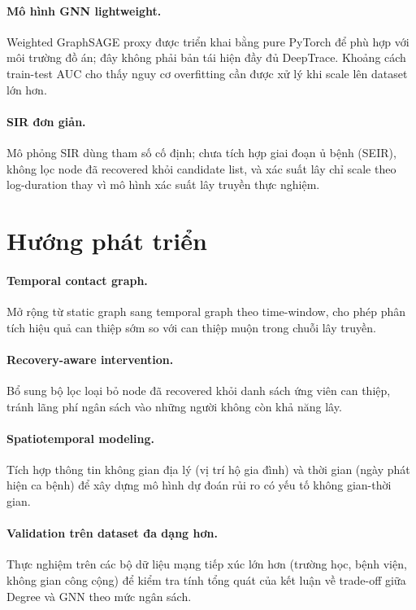 \documentclass[12pt,a4paper]{report}
\theoremstyle{definition}
\begin{document}
\paragraph{Mô hình GNN lightweight.} Weighted GraphSAGE proxy được triển khai bằng pure PyTorch để phù hợp với môi trường đồ án; đây không phải bản tái hiện đầy đủ DeepTrace. Khoảng cách train-test AUC cho thấy nguy cơ overfitting cần được xử lý khi scale lên dataset lớn hơn.

\paragraph{SIR đơn giản.} Mô phỏng SIR dùng tham số cố định; chưa tích hợp giai đoạn ủ bệnh (SEIR), không lọc node đã recovered khỏi candidate list, và xác suất lây chỉ scale theo log-duration thay vì mô hình xác suất lây truyền thực nghiệm.

\section{Hướng phát triển}

\paragraph{Temporal contact graph.} Mở rộng từ static graph sang temporal graph theo time-window, cho phép phân tích hiệu quả can thiệp sớm so với can thiệp muộn trong chuỗi lây truyền.

\paragraph{Recovery-aware intervention.} Bổ sung bộ lọc loại bỏ node đã recovered khỏi danh sách ứng viên can thiệp, tránh lãng phí ngân sách vào những người không còn khả năng lây.

\paragraph{Spatiotemporal modeling.} Tích hợp thông tin không gian địa lý (vị trí hộ gia đình) và thời gian (ngày phát hiện ca bệnh) để xây dựng mô hình dự đoán rủi ro có yếu tố không gian-thời gian.

\paragraph{Validation trên dataset đa dạng hơn.} Thực nghiệm trên các bộ dữ liệu mạng tiếp xúc lớn hơn (trường học, bệnh viện, không gian công cộng) để kiểm tra tính tổng quát của kết luận về trade-off giữa Degree và GNN theo mức ngân sách.
\end{document}

